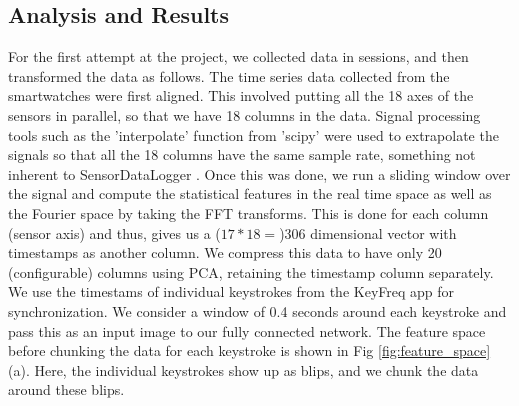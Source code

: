 \documentclass[10pt,twocolumn,letterpaper]{article}
\begin{document}
\subsection{Analysis and Results}
For the first attempt at the project, we collected data in sessions, and then transformed the data as follows. The time series data collected from the smartwatches were first aligned. This involved putting all the 18 axes of the sensors in parallel, so that we have 18 columns in the data. Signal processing tools such as the 'interpolate' function from 'scipy' \cite{scipy} were used to extrapolate the signals so that all the 18 columns have the same sample rate, something not inherent to SensorDataLogger \cite{app}.
Once this was done, we run a sliding window over the signal and compute the statistical features in the real time space as well as the Fourier space by taking the FFT transforms. This is done for each column (sensor axis) and thus, gives us a ($17*18=$)306 dimensional vector with timestamps as another column. We compress this data to have only 20 (configurable) columns using PCA, retaining the timestamp column separately. We use the timestams of individual keystrokes from the KeyFreq \cite{keyfreq} app for synchronization. We consider a window of 0.4 seconds around each keystroke and pass this as an input image to our fully connected network. The feature space before chunking the data for each keystroke is shown in Fig \ref{fig:feature_space} (a). Here, the individual keystrokes show up as blips, and we chunk the data around these blips.
\end{document}

